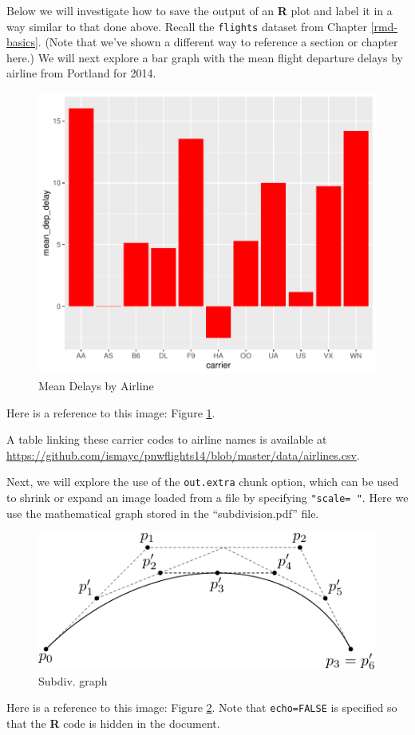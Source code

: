 \documentclass[12pt,twoside]{reedthesis}
\begin{document}
Below we will investigate how to save the output of an \textbf{R} plot and label it in a way similar to that done above. Recall the \texttt{flights} dataset from Chapter \ref{rmd-basics}. (Note that we've shown a different way to reference a section or chapter here.) We will next explore a bar graph with the mean flight departure delays by airline from Portland for 2014.
\begin{figure}
\centering
\includegraphics{thesis_files/figure-latex/delaysboxplot-1.pdf}
\caption{\label{fig:delaysboxplot}Mean Delays by Airline}
\end{figure}
Here is a reference to this image: Figure \ref{fig:delaysboxplot}.

A table linking these carrier codes to airline names is available at \url{https://github.com/ismayc/pnwflights14/blob/master/data/airlines.csv}.

\clearpage

Next, we will explore the use of the \texttt{out.extra} chunk option, which can be used to shrink or expand an image loaded from a file by specifying \texttt{"scale=\ "}. Here we use the mathematical graph stored in the ``subdivision.pdf'' file.
\begin{figure}
\includegraphics[scale=0.75]{figure/subdivision} \caption{Subdiv. graph}\label{fig:subd}
\end{figure}
Here is a reference to this image: Figure \ref{fig:subd}. Note that \texttt{echo=FALSE} is specified so that the \textbf{R} code is hidden in the document.
\end{document}
